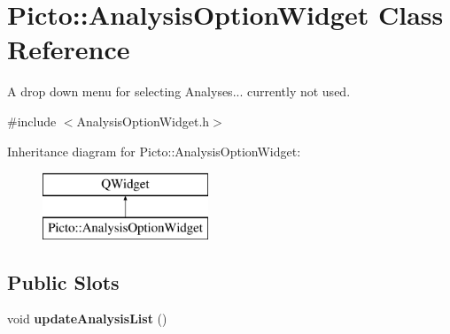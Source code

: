 \hypertarget{class_picto_1_1_analysis_option_widget}{\section{Picto\-:\-:Analysis\-Option\-Widget Class Reference}
\label{class_picto_1_1_analysis_option_widget}
}


A drop down menu for selecting Analyses... currently not used.  




{\ttfamily \#include $<$Analysis\-Option\-Widget.\-h$>$}

Inheritance diagram for Picto\-:\-:Analysis\-Option\-Widget\-:\begin{figure}[H]
\begin{center}
\leavevmode
\includegraphics[height=2.000000cm]{class_picto_1_1_analysis_option_widget}
\end{center}
\end{figure}
\subsection*{Public Slots}
\begin{DoxyCompactItemize}
\item 
\hypertarget{class_picto_1_1_analysis_option_widget_a5d984af5ec98a41d4f582824a73e2ff1}{void {\bfseries update\-Analysis\-List} ()}\label{class_picto_1_1_analysis_option_widget_a5d984af5ec98a41d4f582824a73e2ff1}

\end{DoxyCompactItemize}
